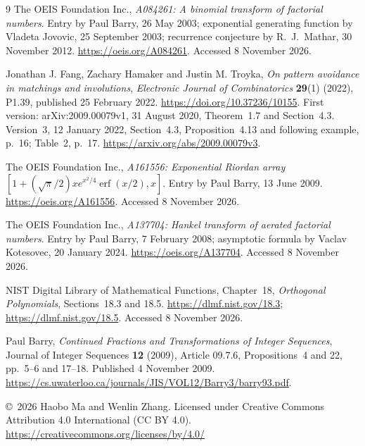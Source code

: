 \documentclass[11pt]{article}
\begin{document}
\begin{thebibliography}{9}
The OEIS Foundation Inc.,
\emph{A084261: A binomial transform of factorial numbers}.
Entry by Paul Barry, 26 May 2003; exponential generating function by
Vladeta Jovovic, 25 September 2003; recurrence conjecture by
R.\ J.\ Mathar, 30 November 2012.
\url{https://oeis.org/A084261}. Accessed 8 November 2026.

Jonathan J. Fang, Zachary Hamaker and Justin M. Troyka,
\emph{On pattern avoidance in matchings and involutions},
\emph{Electronic Journal of Combinatorics} \textbf{29}(1) (2022), P1.39,
published 25 February 2022. \url{https://doi.org/10.37236/10155}.
First version: arXiv:2009.00079v1, 31 August 2020, Theorem~1.7 and
Section~4.3. Version~3, 12 January 2022, Section~4.3,
Proposition~4.13 and following example, p.~16; Table~2, p.~17.
\url{https://arxiv.org/abs/2009.00079v3}.

The OEIS Foundation Inc., \emph{A161556: Exponential Riordan array
$[1+(\sqrt\pi/2)x e^{x^2/4}\operatorname{erf}(x/2),x]$}.
Entry by Paul Barry, 13 June 2009.
\url{https://oeis.org/A161556}. Accessed 8 November 2026.

The OEIS Foundation Inc., \emph{A137704: Hankel transform of aerated
factorial numbers}. Entry by Paul Barry, 7 February 2008;
asymptotic formula by Vaclav Kotesovec, 20 January 2024.
\url{https://oeis.org/A137704}. Accessed 8 November 2026.

NIST Digital Library of Mathematical Functions, Chapter~18,
\emph{Orthogonal Polynomials}, Sections~18.3 and 18.5.
\url{https://dlmf.nist.gov/18.3}; \url{https://dlmf.nist.gov/18.5}.
Accessed 8 November 2026.

Paul Barry, \emph{Continued Fractions and Transformations of Integer
Sequences}, Journal of Integer Sequences \textbf{12} (2009), Article 09.7.6,
Propositions~4 and 22, pp.~5--6 and 17--18. Published 4 November 2009.
\url{https://cs.uwaterloo.ca/journals/JIS/VOL12/Barry3/barry93.pdf}.
\end{thebibliography}

\bigskip\noindent\small
\copyright\ 2026 Haobo Ma and Wenlin Zhang.
Licensed under Creative Commons Attribution 4.0 International (CC BY 4.0).
\url{https://creativecommons.org/licenses/by/4.0/}
\end{document}
